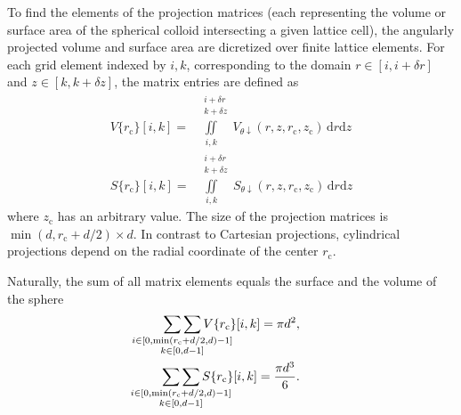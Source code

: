 \documentclass[10pt, a4paper, twocolumn]{article}
\begin{document}
To find the elements of the projection matrices (each representing the volume or surface area of the spherical colloid intersecting a given lattice cell), the angularly projected volume and surface area are dicretized over finite lattice elements.
For each grid element indexed by $i, k$, corresponding to the domain $r \in [i, i + \delta r]$ and $z \in [k, k + \delta z]$, the matrix entries  are defined as
\begin{eqnarray}
    V\{r_{\text{c}}\}{[i, k]} = \! \iint \limits_{i, k}^{\quad \substack{i+\delta r\\ k+\delta z}} \! V_{\theta \downarrow} (r, z, r_{\text{c}}, z_{\text{c}})\, \text{d}r \text{d}z
    \\
    S\{r_{\text{c}}\}{[i, k]} = \! \iint \limits_{i, k}^{\quad \substack{i+\delta r\\ k+\delta z}} \! S_{\theta \downarrow} (r, z, r_{\text{c}}, z_{\text{c}})\, \text{d}r \text{d}z
\end{eqnarray}
where $z_{\text{c}}$ has an arbitrary value.
The size of the projection matrices is $\min(d, r_{\text{c}} + d/2) \times d$.
In contrast to Cartesian projections, cylindrical projections depend on the radial coordinate of the center $r_{\text{c}}$.

Naturally, the sum of all matrix elements equals the surface and the volume of the sphere
\begin{eqnarray*}
    \mathop{\sum\sum}_{\mathclap{\substack{i \in [0, \min(r_{\text{c}}+d/2,d)-1] \\ k \in [0, d-1]}}}  V\{r_{\text{c}}\}{[i, k]} = \pi d^2,
    \\
    \mathop{\sum\sum}_{\mathclap{\substack{i \in [0, \min(r_{\text{c}}+d/2,d)-1] \\ k \in [0, d-1]}}}  S\{r_{\text{c}}\}{[i, k]} = \frac{\pi d^3}{6} .
\end{eqnarray*}
\end{document}
